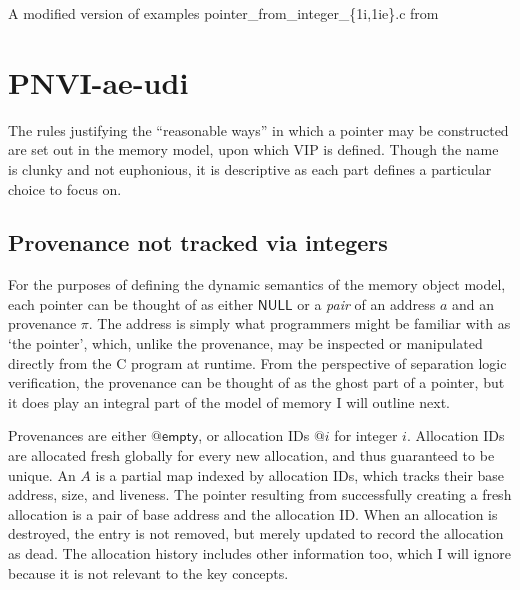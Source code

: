\begin{marginfigure}
    \raggedright%
    \caption{A modified version of examples
        pointer\_from\_integer\_\{1i,1ie\}.c
        from~\textcite{memarian2019exploring}}\label{fig:mem-model-ptr-from-int}
\end{marginfigure}%

\section{PNVI-ae-udi}

The rules justifying the ``reasonable ways'' in which a pointer may be
constructed are set out in the  memory model, upon which VIP is
defined. Though the name is clunky and not euphonious, it is descriptive as each
part defines a particular choice to focus on.

\subsection{Provenance not tracked via integers}

For the purposes of defining the dynamic semantics of the memory object model,
each pointer can be thought of as either $\mathsf{NULL}$ or a \emph{pair} of an
address $a$ and an provenance $\pi$. The address is simply what programmers
might be familiar with as `the pointer', which, unlike the provenance, may be
inspected or manipulated directly from the C program at runtime. From the
perspective of separation logic verification, the provenance can be thought of
as the ghost part of a pointer, but it does play an integral part of the model
of memory I will outline next.

Provenances are either $@\mathsf{empty}$, or allocation IDs $@i$ for integer
$i$. Allocation IDs are allocated fresh
globally for every new
allocation, and thus guaranteed to be unique. An 
$\mathit{A}$ is a partial map indexed by allocation IDs, which tracks their
base address, size, and liveness. The pointer
resulting from successfully creating a fresh allocation is a pair of base
address and the allocation ID\@. When an allocation is destroyed, the entry is
not removed, but merely updated to record the allocation as dead. The
allocation history includes other information too, which I will ignore because
it is not relevant to the key concepts.

